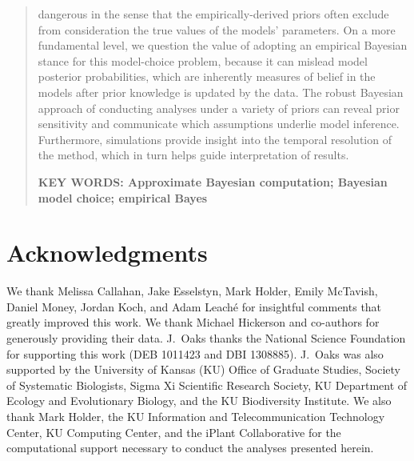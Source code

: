 \documentclass[letterpaper,12pt]{article}
\begin{document}
\begin{abstract}
    dangerous in the sense that the empirically-derived priors often
    exclude from consideration the true values of the models' parameters.
    On a more fundamental level, we question the value of adopting an empirical
    Bayesian stance for this model-choice problem, because it can mislead model
    posterior probabilities, which are inherently measures of belief in the
    models after prior knowledge is updated by the data.
    The robust Bayesian approach of conducting analyses under a variety
    of priors can reveal prior sensitivity and communicate which assumptions
    underlie model inference.
    Furthermore, simulations provide insight into the temporal resolution of
    the method, which in turn helps guide interpretation of results.

    \vspace{12pt}
    \noindent\textbf{KEY WORDS: Approximate Bayesian computation; Bayesian
        model choice; empirical Bayes} 
\end{abstract}

\newpage



\section{Acknowledgments}
We thank Melissa Callahan, Jake Esselstyn, Mark Holder, Emily McTavish, Daniel
Money, Jordan Koch, and Adam Leach\'{e} for insightful comments that greatly
improved this work.
We thank Michael Hickerson and co-authors for generously providing their data.
J.\ Oaks thanks the National Science Foundation for supporting this work (DEB
1011423 and DBI 1308885).
J.\ Oaks was also supported by the University of Kansas (KU) Office of Graduate
Studies, Society of Systematic Biologists, Sigma Xi Scientific Research
Society, KU Department of Ecology and Evolutionary Biology, and the KU
Biodiversity Institute.
We also thank Mark Holder, the KU Information and Telecommunication Technology
Center, KU Computing Center, and the iPlant Collaborative for the computational
support necessary to conduct the analyses presented herein.



\newpage
\singlespacing

\renewcommand\listfigurename{Figure Captions}
\renewcommand\cftdotsep{\cftnodots}
\setlength\cftbeforefigskip{10pt}
\listoffigures
\end{document}
